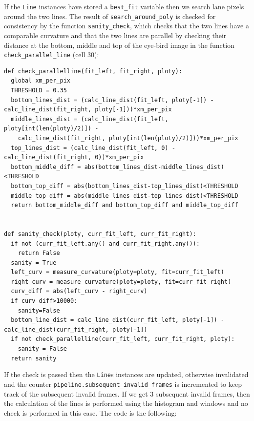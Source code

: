 \documentclass{article}
\let\cd\lstinline
\begin{document}
If the \cd+Line+ instances have stored a \cd+best_fit+ variable then we search lane pixels around the two lines. The result of \cd+search_around_poly+ is checked for consistency by the function \cd+sanity_check+, which checks that the two lines have a comparable curvature and that the two lines are parallel by checking their distance at the bottom, middle and top of the eye-bird image in the function \cd+check_parallel_line+ (cell 30):
\begin{lstlisting}
def check_parallelline(fit_left, fit_right, ploty):
  global xm_per_pix
  THRESHOLD = 0.35
  bottom_lines_dist = (calc_line_dist(fit_left, ploty[-1]) - calc_line_dist(fit_right, ploty[-1]))*xm_per_pix
  middle_lines_dist = (calc_line_dist(fit_left, ploty[int(len(ploty)/2)]) - 
    calc_line_dist(fit_right, ploty[int(len(ploty)/2)]))*xm_per_pix
  top_lines_dist = (calc_line_dist(fit_left, 0) - calc_line_dist(fit_right, 0))*xm_per_pix
  bottom_middle_diff = abs(bottom_lines_dist-middle_lines_dist)<THRESHOLD
  bottom_top_diff = abs(bottom_lines_dist-top_lines_dist)<THRESHOLD
  middle_top_diff = abs(middle_lines_dist-top_lines_dist)<THRESHOLD
  return bottom_middle_diff and bottom_top_diff and middle_top_diff


def sanity_check(ploty, curr_fit_left, curr_fit_right):
  if not (curr_fit_left.any() and curr_fit_right.any()):
    return False
  sanity = True
  left_curv = measure_curvature(ploty=ploty, fit=curr_fit_left)
  right_curv = measure_curvature(ploty=ploty, fit=curr_fit_right)
  curv_diff = abs(left_curv - right_curv)
  if curv_diff>10000: 
    sanity=False
  bottom_line_dist = calc_line_dist(curr_fit_left, ploty[-1]) - calc_line_dist(curr_fit_right, ploty[-1])
  if not check_parallelline(curr_fit_left, curr_fit_right, ploty):
    sanity = False
  return sanity
\end{lstlisting}
If the check is passed then the \cd+Line+s instances are updated, otherwise invalidated and the counter \cd+pipeline.subsequent_invalid_frames+ is incremented to keep track of the subsequent invalid frames. If we get 3 subsequent invalid frames, then the calculation of the lines is performed using the histogram and windows and no check is performed in this case. The code is the following:
\end{document}

